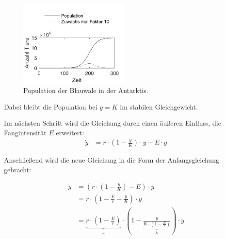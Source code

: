 \documentclass[a4paper,twoside]{article}
\begin{document}
	\begin{figure}[!h]
  		\centering
 		\includegraphics[width=5.5cm]{Diagramme/wachstum_ohne_einfluesse.png}
  		\caption{Population der Blauwale in der Antarktis.}
  		\label{fig:wachstum_ohne_einfluesse}
	\end{figure}

	Dabei bleibt die Population bei \(y = K\) im stabilen Gleichgewicht.

	Im nächsten Schritt wird die Gleichung durch einen äußeren Einfluss, die Fangintensität \(E\) erweitert:
	\begin{align*}
		\dot{y} &= r \cdot\left(1-\frac{y}{K}\right) \cdot y - E \cdot y
	\end{align*}	
	
	Anschließend wird die neue Gleichung in die Form der Anfangsgleichung gebracht:
		
	\begin{align*}
		\dot{y} &= \left( r \cdot\left(1 - \frac{y}{K}\right) - E\right) \cdot y \\
		&= r \cdot \left( 1 - \frac{E}{r} - \frac{y}{K} \right) \cdot y \\
		&= \underbrace{r \cdot \left( 1 - \frac{E}{r} \right)}_{\tilde{r}} \cdot \left( 1 - \frac{y}{\underbrace{K \cdot \left(1 - \frac{E}{r}\right)}_{\tilde{K}}} \right) \cdot y
	\end{align*}
	
\end{document}
